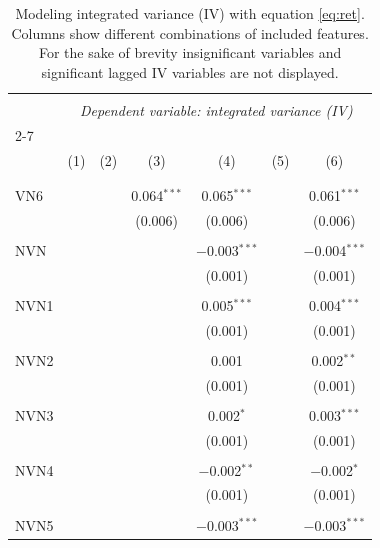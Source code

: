 
\begin{table}[!htbp] \centering 
 \caption{Modeling integrated variance (IV) with equation \eqref{eq:ret}. Columns show different combinations of included features. For the sake of brevity insignificant variables and significant lagged IV variables are not displayed. } 
  \label{IVmodels1_t} 
\tiny 
\begin{tabular}{@{\extracolsep{5pt}}lcccccc} 
\\[-1.8ex]\hline 
\hline \\[-1.8ex] 
 & \multicolumn{6}{c}{\textit{Dependent variable: integrated variance (IV)}} \\ 
\cline{2-7} 
\\[-1.8ex] & (1) & (2) & (3) & (4) & (5) & (6)\\ 
\hline \\[-1.8ex] 
& & & & & & \\ 
 VN6 &  &  & 0.064$^{***}$ & 0.065$^{***}$ &  & 0.061$^{***}$ \\ 
 &  &  & (0.006) & (0.006) &  & (0.006) \\ 
 & & & & & & \\ 
 NVN &  &  &  & $-$0.003$^{***}$ &  & $-$0.004$^{***}$ \\ 
 &  &  &  & (0.001) &  & (0.001) \\ 
 & & & & & & \\ 
 NVN1 &  &  &  & 0.005$^{***}$ &  & 0.004$^{***}$ \\ 
 &  &  &  & (0.001) &  & (0.001) \\ 
 & & & & & & \\ 
 NVN2 &  &  &  & 0.001 &  & 0.002$^{**}$ \\ 
 &  &  &  & (0.001) &  & (0.001) \\ 
 & & & & & & \\ 
 NVN3 &  &  &  & 0.002$^{*}$ &  & 0.003$^{***}$ \\ 
 &  &  &  & (0.001) &  & (0.001) \\ 
 & & & & & & \\ 
 NVN4 &  &  &  & $-$0.002$^{**}$ &  & $-$0.002$^{*}$ \\ 
 &  &  &  & (0.001) &  & (0.001) \\ 
 & & & & & & \\ 
 NVN5 &  &  &  & $-$0.003$^{***}$ &  & $-$0.003$^{***}$ \\ 

\end{tabular}
\end{table}
